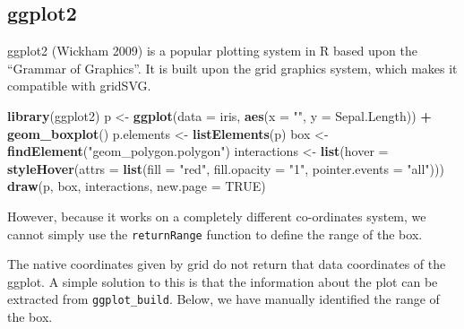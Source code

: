 \documentclass[11pt,]{report}
\newenvironment{Shaded}{\begin{snugshade}}{\end{snugshade}}
\newcommand{\KeywordTok}[1]{\textcolor[rgb]{0.13,0.29,0.53}{\textbf{#1}}}
\newcommand{\DataTypeTok}[1]{\textcolor[rgb]{0.13,0.29,0.53}{#1}}
\newcommand{\DecValTok}[1]{\textcolor[rgb]{0.00,0.00,0.81}{#1}}
\newcommand{\StringTok}[1]{\textcolor[rgb]{0.31,0.60,0.02}{#1}}
\newcommand{\CommentTok}[1]{\textcolor[rgb]{0.56,0.35,0.01}{\textit{#1}}}
\newcommand{\OtherTok}[1]{\textcolor[rgb]{0.56,0.35,0.01}{#1}}
\newcommand{\OperatorTok}[1]{\textcolor[rgb]{0.81,0.36,0.00}{\textbf{#1}}}
\newcommand{\NormalTok}[1]{#1}
\begin{document}
\subsection{ggplot2}\label{ggplot2}

\textsf{ggplot2} (Wickham 2009) is a popular plotting system in R based
upon the ``Grammar of Graphics''. It is built upon the \textsf{grid}
graphics system, which makes it compatible with \textsf{gridSVG}.

\begin{Shaded}
\begin{Highlighting}[]
\KeywordTok{library}\NormalTok{(ggplot2)}
\NormalTok{p <-}\StringTok{ }\KeywordTok{ggplot}\NormalTok{(}\DataTypeTok{data =}\NormalTok{ iris, }\KeywordTok{aes}\NormalTok{(}\DataTypeTok{x =} \StringTok{""}\NormalTok{, }\DataTypeTok{y =}\NormalTok{ Sepal.Length)) }\OperatorTok{+}\StringTok{ }\KeywordTok{geom_boxplot}\NormalTok{()}
\NormalTok{p.elements <-}\StringTok{ }\KeywordTok{listElements}\NormalTok{(p)}
\NormalTok{box <-}\StringTok{ }\KeywordTok{findElement}\NormalTok{(}\StringTok{"geom_polygon.polygon"}\NormalTok{)}
\NormalTok{interactions <-}\StringTok{ }\KeywordTok{list}\NormalTok{(}\DataTypeTok{hover =} \KeywordTok{styleHover}\NormalTok{(}\DataTypeTok{attrs =} \KeywordTok{list}\NormalTok{(}\DataTypeTok{fill =} \StringTok{"red"}\NormalTok{,}
                                                     \DataTypeTok{fill.opacity =} \StringTok{"1"}\NormalTok{,}
                                                     \DataTypeTok{pointer.events =} \StringTok{"all"}\NormalTok{)))}
\KeywordTok{draw}\NormalTok{(p, box, interactions, }\DataTypeTok{new.page =} \OtherTok{TRUE}\NormalTok{)}
\end{Highlighting}
\end{Shaded}

However, because it works on a completely different co-ordinates system,
we cannot simply use the \texttt{returnRange} function to define the
range of the box.

The native coordinates given by \textsf{grid} do not return that data
coordinates of the ggplot. A simple solution to this is that the
information about the plot can be extracted from \texttt{ggplot\_build}.
Below, we have manually identified the range of the box.

\begin{Shaded}
\end{Shaded}
\end{document}
